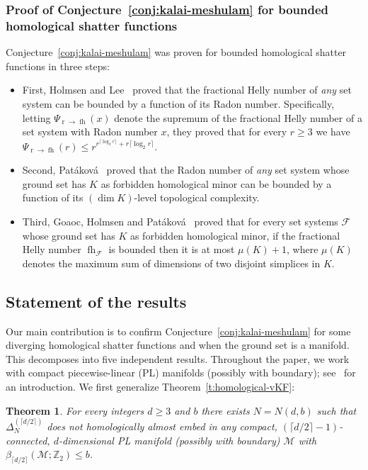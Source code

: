 \documentclass[11pt]{article}
\newcommand{\Z}{\mathbb{Z}}
\newcommand{\F}{\mathcal{F}}
\newcommand{\M}{\mathcal{M}}
\DeclareMathOperator{\rad}{r}
\DeclareMathOperator{\fh}{fh}
\newtheorem{theorem}{Theorem}
\begin{document}
\subsubsection{Proof of Conjecture~\ref{conj:kalai-meshulam} for bounded homological shatter functions}
%
Conjecture~\ref{conj:kalai-meshulam} was proven for bounded homological shatter functions in three steps: 
%
\begin{itemize}
\item First, Holmsen and Lee~\cite[Theorem~1.1]{Holmsen2021} proved that the fractional Helly number of \emph{any} set system can be bounded by a function of its Radon number. Specifically, letting $\Psi_{\rad \to \fh}(x)$ denote the supremum of the fractional Helly number of a set system with Radon number $x$, they proved  that for every $r \ge 3$ we have $\Psi_{\rad \to \fh}(r) \le r^{r^{\lceil \log_2r \rceil}+r\lceil \log_2r \rceil}$.\medskip
%
\item Second, Patáková~\cite[Theorem~2.1]{patakova2022bounding} proved that the Radon number of \emph{any} set system whose ground set has $K$ as forbidden homological minor can be bounded by a function of its $(\dim K)$-level topological complexity.\medskip
%
\item Third, Goaoc, Holmsen and Patáková~\cite[Theorem~1.2]{steppingUp} proved that for every set systems $\F$ whose ground set has $K$ as forbidden homological minor, if the fractional Helly number $\fh_\F$ is bounded then it is at most $\mu(K)+1$, where $\mu(K)$ denotes the maximum sum of dimensions of two disjoint simplices in $K$.
\end{itemize}
%
%
%
\subsection{Statement of the results}\label{s:results}
%
Our main contribution is to confirm Conjecture~\ref{conj:kalai-meshulam} for some diverging homological shatter functions and when the ground set is a manifold. This decomposes into five independent results.
%
\medskip
%
Throughout the paper, we work with compact piecewise-linear (PL) manifolds (possibly with  boundary); see~\cite[$\mathsection 1$]{Rourke1972IntroductionTP} for an introduction. We first generalize Theorem~\ref{t:homological-vKF}:
%

\begin{theorem}\label{t:forbidden}
For every integers $d \ge 3$ and $b$ there exists $N=N(d,b)$ such that $\Delta_{N}^{(\lceil d/2 \rceil)}$ does not homologically almost embed in any compact, $(\lceil d/2 \rceil-1)$-connected, $d$-dimensional PL manifold (possibly with boundary) $\M$ with $\beta_{\lceil d/2 \rceil}(\M;\Z_2) \le b$.
\end{theorem}
\end{document}
